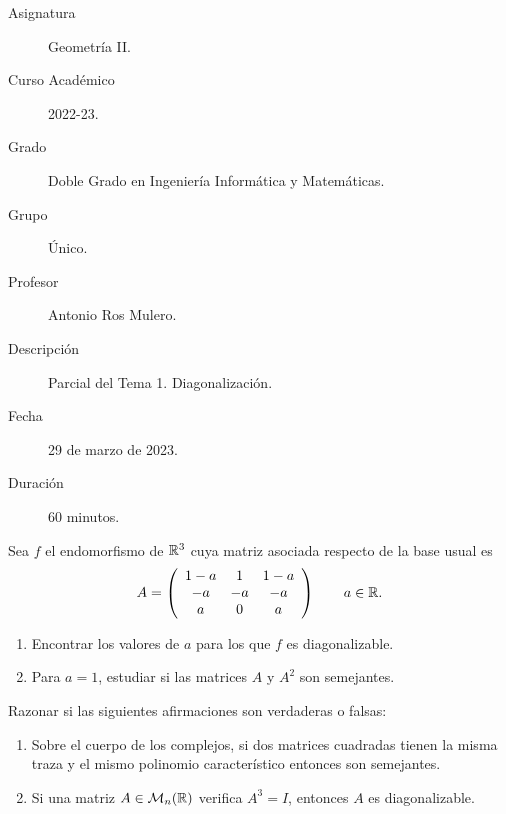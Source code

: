 \documentclass[12pt]{article}
\begin{document}

    
    

    \begin{description}
        \item[Asignatura] Geometría II.
        \item[Curso Académico] 2022-23.
        \item[Grado] Doble Grado en Ingeniería Informática y Matemáticas.
        \item[Grupo] Único.
        \item[Profesor] Antonio Ros Mulero.
        \item[Descripción] Parcial del Tema 1. Diagonalización.
        \item[Fecha] 29 de marzo de 2023.
        \item[Duración] 60 minutos.
    
    \end{description}
    \newpage
    
    \begin{ejercicio} [6 ptos] Sea $f$ el endomorfismo de $\mathbb{R}^3$ cuya matriz asociada respecto de la base usual es
    \begin{equation*}
        A = \left( \begin{array}{ccc}
            1-a & 1 & 1-a \\
            -a & -a & -a\\
            a & 0 & a
        \end{array}\right) \qquad  a\in \mathbb{R}.
    \end{equation*}
    \begin{enumerate}
        \item Encontrar los valores de $a$ para los que $f$ es diagonalizable.
        \item Para $a=1$, estudiar si las matrices $A$ y $A^2$ son semejantes.
    \end{enumerate}
\end{ejercicio}

\vspace{1cm}

\begin{ejercicio} [4 ptos]
    Razonar si las siguientes afirmaciones son verdaderas o falsas:
    \begin{enumerate}
        \item Sobre el cuerpo de los complejos, si dos matrices cuadradas tienen la misma traza y el mismo polinomio característico entonces son semejantes.

        \item Si una matriz $A\in \mathcal{M}_n(\mathbb{R})$ verifica $A^3=I$, entonces $A$ es diagonalizable.
    \end{enumerate}
\end{ejercicio}
\end{document}
